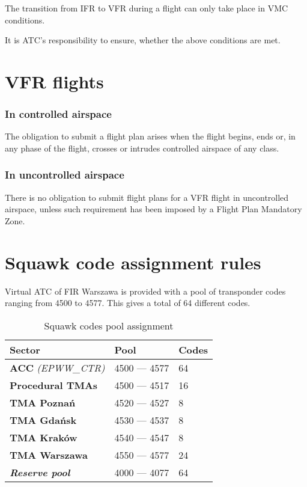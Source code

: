 The transition from IFR to VFR during a flight can only take place in VMC conditions.

It is ATC's responsibility to ensure, whether the above conditions are met.

\section{VFR flights}%

\subsubsection{In controlled airspace}
The obligation to submit a flight plan arises when the flight begins, ends or, in any phase of the flight, crosses or intrudes controlled airspace of any class.

\subsubsection{In uncontrolled airspace}
There is no obligation to submit flight plans for a VFR flight in uncontrolled airspace, unless such requirement has been imposed by a Flight Plan Mandatory Zone.

\section{Squawk code assignment rules}%
\label{sect:airspace:squawks}

Virtual ATC of FIR Warszawa is provided with a pool of transponder codes ranging from 4500 to 4577. This gives a total of 64 different codes.

\begin{table}[htbp]
    \centering
    \begin{tabular}{|l|l|l|}
        \rowcolor{vred}
        \color{white}\textbf Sector & \color{white}\textbf Pool & \color{white}\textbf Codes\\\hline
        \textbf{ACC} \textit{(EPWW\_CTR)} & 4500 --- 4577 & 64\\\hline
        \textbf{Procedural TMAs} & 4500 --- 4517 & 16 \\\hline
        \textbf{TMA Poznań} & 4520 --- 4527 & 8\\\hline
        \textbf{TMA Gdańsk} & 4530 --- 4537 & 8\\\hline
        \textbf{TMA Kraków} & 4540 --- 4547 & 8\\\hline
        \textbf{TMA Warszawa} & 4550 --- 4577 & 24\\\hline
        \textit{\textbf{Reserve pool}} & 4000 --- 4077 & 64\\\hline
    \end{tabular}
    \caption{Squawk codes pool assignment}
    \label{tbl:squawk}
\end{table}

